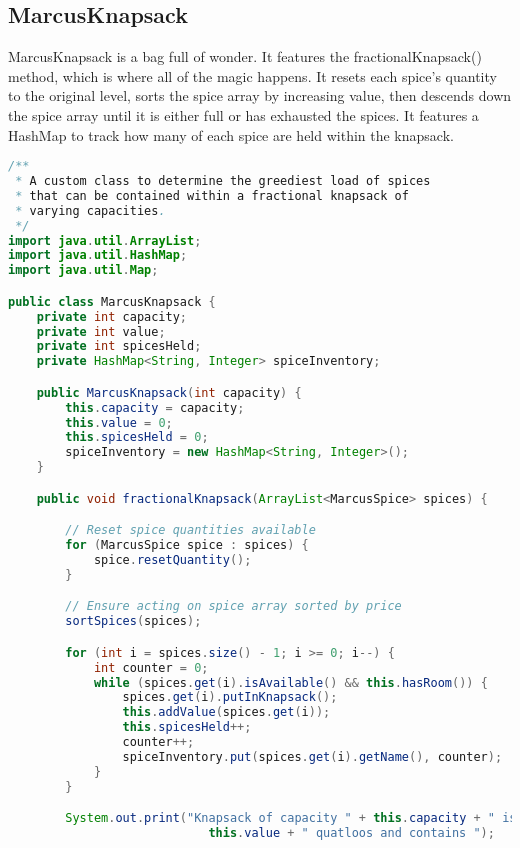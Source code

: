\documentclass[letterpaper, 10pt]{article}
\begin{document}
\subsection{MarcusKnapsack}

\hspace{1.0em}MarcusKnapsack is a bag full of wonder. It features the fractionalKnapsack() method, which is where all of the magic happens. It resets each spice's quantity to the original level, sorts the spice array by increasing value, then descends down the spice array until it is either full or has exhausted the spices. It features a HashMap to track how many of each spice are held within the knapsack.

\vspace{2.0em}

\begin{lstlisting}[language=Java, firstnumber=1]
/**
 * A custom class to determine the greediest load of spices
 * that can be contained within a fractional knapsack of
 * varying capacities.
 */
import java.util.ArrayList;
import java.util.HashMap;
import java.util.Map;

public class MarcusKnapsack {
    private int capacity;
    private int value;
    private int spicesHeld;
    private HashMap<String, Integer> spiceInventory;

    public MarcusKnapsack(int capacity) {
        this.capacity = capacity;
        this.value = 0;
        this.spicesHeld = 0;
        spiceInventory = new HashMap<String, Integer>();
    }

    public void fractionalKnapsack(ArrayList<MarcusSpice> spices) {

        // Reset spice quantities available
        for (MarcusSpice spice : spices) {
            spice.resetQuantity();
        }

        // Ensure acting on spice array sorted by price
        sortSpices(spices);

        for (int i = spices.size() - 1; i >= 0; i--) {
            int counter = 0;
            while (spices.get(i).isAvailable() && this.hasRoom()) {
                spices.get(i).putInKnapsack();
                this.addValue(spices.get(i));
                this.spicesHeld++;
                counter++;
                spiceInventory.put(spices.get(i).getName(), counter);
            }
        }

        System.out.print("Knapsack of capacity " + this.capacity + " is worth " +
                            this.value + " quatloos and contains ");


\end{lstlisting}
\end{document}
